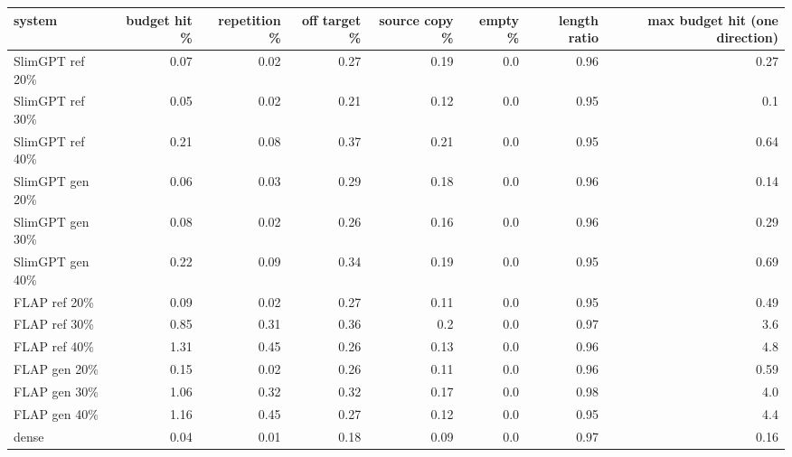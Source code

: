\begin{tabular}{lrrrrrrr}
\toprule
system & budget hit \% & repetition \% & off target \% & source copy \% & empty \% & length ratio & max budget hit (one direction) \\
\midrule
SlimGPT ref 20\% & 0.07 & 0.02 & 0.27 & 0.19 & 0.0 & 0.96 & 0.27 \\
SlimGPT ref 30\% & 0.05 & 0.02 & 0.21 & 0.12 & 0.0 & 0.95 & 0.1 \\
SlimGPT ref 40\% & 0.21 & 0.08 & 0.37 & 0.21 & 0.0 & 0.95 & 0.64 \\
SlimGPT gen 20\% & 0.06 & 0.03 & 0.29 & 0.18 & 0.0 & 0.96 & 0.14 \\
SlimGPT gen 30\% & 0.08 & 0.02 & 0.26 & 0.16 & 0.0 & 0.96 & 0.29 \\
SlimGPT gen 40\% & 0.22 & 0.09 & 0.34 & 0.19 & 0.0 & 0.95 & 0.69 \\
FLAP ref 20\% & 0.09 & 0.02 & 0.27 & 0.11 & 0.0 & 0.95 & 0.49 \\
FLAP ref 30\% & 0.85 & 0.31 & 0.36 & 0.2 & 0.0 & 0.97 & 3.6 \\
FLAP ref 40\% & 1.31 & 0.45 & 0.26 & 0.13 & 0.0 & 0.96 & 4.8 \\
FLAP gen 20\% & 0.15 & 0.02 & 0.26 & 0.11 & 0.0 & 0.96 & 0.59 \\
FLAP gen 30\% & 1.06 & 0.32 & 0.32 & 0.17 & 0.0 & 0.98 & 4.0 \\
FLAP gen 40\% & 1.16 & 0.45 & 0.27 & 0.12 & 0.0 & 0.95 & 4.4 \\
dense & 0.04 & 0.01 & 0.18 & 0.09 & 0.0 & 0.97 & 0.16 \\
\bottomrule
\end{tabular}
